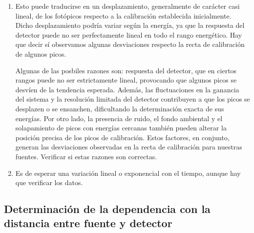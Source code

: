\documentclass[11pt]{article}
\begin{document}
\begin{enumerate}[label=\alph*)]
    \item Esto puede traducirse en un desplazamiento, generalmente de carácter casi lineal, de los fotópicos respecto a la calibración establecida inicialmente. Dicho desplazamiento podría variar según la energía, ya que la respuesta del detector puede no ser perfectamente lineal en todo el rango energético. \textcolor{BrickRed}{Hay que decir sí observamos algunas desviaciones respecto la recta de calibración de algunos picos.} 
    
    Algunas de las posbiles razones son: respuesta del detector, que en ciertos rangos puede no ser estrictamente lineal, provocando que algunos picos se desvíen de la tendencia esperada. Además, las fluctuaciones en la ganancia del sistema y la resolución limitada del detector contribuyen a que los picos se desplazen o se ensanchen, dificultando la determinación exacta de sus energías. Por otro lado, la presencia de ruido, el fondo ambiental y el solapamiento de picos con energías cercanas también pueden alterar la posición precisa de los picos de calibración. Estos factores, en conjunto, generan las desviaciones observadas en la recta de calibración para nuestras fuentes. \textcolor{BrickRed}{Verificar si estas razones son correctas.}
    \item  \textcolor{BrickRed}{Es de esperar una variación lineal o exponencial con el tiempo, aunque hay que verificar los datos.}
\end{enumerate}

\subsection{Determinación de la dependencia con la distancia entre fuente y detector}
\end{document}

